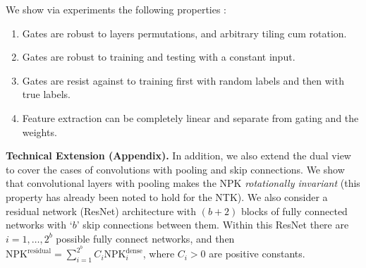 We show via experiments the following properties :
\begin{enumerate}
\item Gates are robust to layers permutations, and arbitrary tiling cum rotation.
\item Gates are robust to  training and testing with a constant input. 
\item Gates are resist against to training first with random labels and then with true labels. 
\item Feature extraction can be completely linear and separate from gating and the weights.
\end{enumerate}
\textbf{Technical Extension (Appendix).} In addition, we also extend the dual view to cover the cases of convolutions with pooling and skip connections. We show that convolutional layers with pooling makes the NPK \emph{rotationally invariant} (this property has already been noted to hold for the NTK). We also consider a residual network (ResNet) architecture with $(b+2)$ blocks of fully connected networks with `$b$' skip connections between them. Within this ResNet there are $i=1,\ldots,2^b$ possible fully connect networks, and then $\text{NPK}^{\text{residual}}=\sum_{i=1}^{2^b} C_i \text{NPK}^{\text{dense}}_i$, where $C_i>0$ are positive constants.
\begin{comment}

CNN, Resnet to say that the framework can be extended successfully.

Perhaps the second important and powerful insights lie in the experimental implication contribution

why do we even care for a specific theory?

All through we differentiate from \cite{npk}
\end{comment}